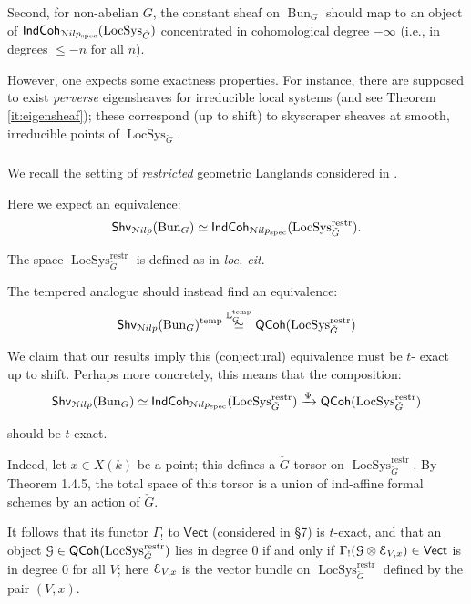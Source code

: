 \documentclass[reqno,11pt]{amsart}
\numberwithin{equation}{subsection}
\theoremstyle{remark}
\newcommand{\xar}[1]{\xrightarrow{#1}}
\newcommand{\bL}{{\mathbb L}}
\newcommand{\sE}{{\EuScript E}}
\newcommand{\sG}{{\EuScript G}}
\newcommand{\sN}{{\EuScript N}}
\newcommand{\on}{\operatorname}
\newcommand{\Vect}{\mathsf{Vect}}
\newcommand{\Bun}{\on{Bun}}
\newcommand{\LocSys}{\on{LocSys}}
\newcommand{\IndCoh}{\mathsf{IndCoh}}
\newcommand{\QCoh}{\mathsf{QCoh}}
\newcommand{\Shv}{\mathsf{Shv}}
\newcommand{\temp}{\on{temp}}
\newcommand{\Nilp}{\sN ilp}
\begin{document}
Second, for non-abelian $G$, the constant sheaf on $\Bun_G$
should map to an object of $\IndCoh_{\Nilp_{\on{spec}}}(\LocSys_{\check{G}})$
concentrated in cohomological degree $-\infty$ (i.e., in degrees 
$\leq -n$ for all $n$).

However, one expects some exactness properties. For instance,
there are supposed to exist \emph{perverse} eigensheaves for irreducible
local systems (and see Theorem \ref{it:eigensheaf});
these correspond (up to shift) to skyscraper sheaves at smooth, 
irreducible points of $\LocSys_{\check{G}}$.

\subsubsection{}\label{sss:temp-gl-exact-intro}

We recall the setting of \emph{restricted} geometric Langlands
considered in \cite{agkrrv1}.

Here we expect an equivalence:
%
\[
\Shv_{\Nilp}(\Bun_G) \simeq 
\IndCoh_{\Nilp_{\on{spec}}}(\LocSys_{\check{G}}^{\on{restr}}).
\]

\noindent The space $\LocSys_{\check{G}}^{\on{restr}}$ is defined
as in \emph{loc. cit}.

The tempered analogue should instead find an equivalence:
%
\[
\Shv_{\Nilp}(\Bun_G)^{\temp} \overset{\bL_G^{\temp}}{\simeq} 
\QCoh(\LocSys_{\check{G}}^{\on{restr}})
\]

\noindent We claim that our results imply this (conjectural) equivalence must be $t$-
exact up to shift. Perhaps more concretely, this means that the composition:
%
\[
\Shv_{\Nilp}(\Bun_G) \simeq 
\IndCoh_{\Nilp_{\on{spec}}}(\LocSys_{\check{G}}^{\on{restr}})
\xar{\Psi}
\QCoh(\LocSys_{\check{G}}^{\on{restr}})
\]

\noindent should be $t$-exact.

Indeed, let $x \in X(k)$ be a point; this defines
a $\check{G}$-torsor on $\LocSys_{\check{G}}^{\on{restr}}$.
By \cite{agkrrv1} Theorem 1.4.5, the total space of this
torsor is a union of ind-affine formal schemes by an action of $\check{G}$.

It follows that its functor $\Gamma_!$ to $\Vect$ (considered in \cite{agkrrv1}
\S 7) is $t$-exact, and that an object 
$\sG \in \QCoh(\LocSys_{\check{G}}^{\on{restr}})$ lies
in degree $0$ if and only if $\Gamma_!(\sG \otimes \sE_{V,x}) \in \Vect$ is
in degree $0$ for all $V$; here $\sE_{V,x}$ is the vector
bundle on $\LocSys_{\check{G}}^{\on{restr}}$ defined by the pair $(V,x)$.
\end{document}
